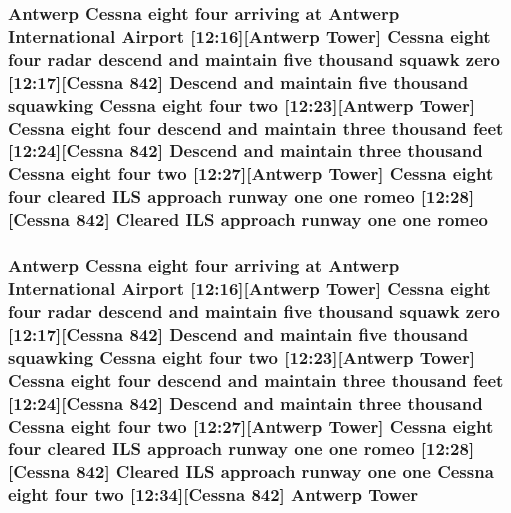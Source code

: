 \subsubsection[{\texorpdfstring{romeo}{romeo}}]{\setlength{\rightskip}{0pt plus 5cm}Antwerp {\bf Cessna} eight four arriving at Antwerp International {\bf Airport} \mbox{[}12\+:16\mbox{]}\mbox{[}Antwerp {\bf Tower}\mbox{]} {\bf Cessna} eight four radar descend and maintain five {\bf thousand} squawk {\bf zero} \mbox{[}12\+:17\mbox{]}\mbox{[}{\bf Cessna} 842\mbox{]} Descend and maintain five {\bf thousand} {\bf squawking} {\bf Cessna} eight four {\bf two} \mbox{[}12\+:23\mbox{]}\mbox{[}Antwerp {\bf Tower}\mbox{]} {\bf Cessna} eight four descend and maintain three {\bf thousand} {\bf feet} \mbox{[}12\+:24\mbox{]}\mbox{[}{\bf Cessna} 842\mbox{]} Descend and maintain three {\bf thousand} {\bf Cessna} eight four {\bf two} \mbox{[}12\+:27\mbox{]}\mbox{[}Antwerp {\bf Tower}\mbox{]} {\bf Cessna} eight four cleared I\+LS approach runway {\bf one} {\bf one} romeo \mbox{[}12\+:28\mbox{]}\mbox{[}{\bf Cessna} 842\mbox{]} Cleared I\+LS approach runway {\bf one} {\bf one} romeo}\hypertarget{happyDay1ExpectedATC_8txt_a06b6f6d56485147ded0d7b2537c6538c}{}\label{happyDay1ExpectedATC_8txt_a06b6f6d56485147ded0d7b2537c6538c}
\subsubsection[{\texorpdfstring{Tower}{Tower}}]{\setlength{\rightskip}{0pt plus 5cm}Antwerp {\bf Cessna} eight four arriving at Antwerp International {\bf Airport} \mbox{[}12\+:16\mbox{]}\mbox{[}Antwerp Tower\mbox{]} {\bf Cessna} eight four radar descend and maintain five {\bf thousand} squawk {\bf zero} \mbox{[}12\+:17\mbox{]}\mbox{[}{\bf Cessna} 842\mbox{]} Descend and maintain five {\bf thousand} {\bf squawking} {\bf Cessna} eight four {\bf two} \mbox{[}12\+:23\mbox{]}\mbox{[}Antwerp Tower\mbox{]} {\bf Cessna} eight four descend and maintain three {\bf thousand} {\bf feet} \mbox{[}12\+:24\mbox{]}\mbox{[}{\bf Cessna} 842\mbox{]} Descend and maintain three {\bf thousand} {\bf Cessna} eight four {\bf two} \mbox{[}12\+:27\mbox{]}\mbox{[}Antwerp Tower\mbox{]} {\bf Cessna} eight four cleared I\+LS approach runway {\bf one} {\bf one} {\bf romeo} \mbox{[}12\+:28\mbox{]}\mbox{[}{\bf Cessna} 842\mbox{]} Cleared I\+LS approach runway {\bf one} {\bf one} {\bf Cessna} eight four {\bf two} \mbox{[}12\+:34\mbox{]}\mbox{[}{\bf Cessna} 842\mbox{]} Antwerp Tower}\hypertarget{happyDay1ExpectedATC_8txt_a1eb79599ee2cca5bc8c8adc87a257c7c}{}\label{happyDay1ExpectedATC_8txt_a1eb79599ee2cca5bc8c8adc87a257c7c}
